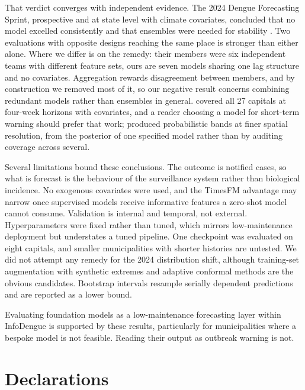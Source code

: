 \documentclass[11pt]{article}
\begin{document}
That verdict converges with independent evidence. The 2024 Dengue Forecasting Sprint,
prospective and at state level with climate covariates, concluded that no model excelled
consistently and that ensembles were needed for stability \citep{Araujo2026sprint}. Two
evaluations with opposite designs reaching the same place is stronger than either alone.
Where we differ is on the remedy: their members were six independent teams with different
feature sets, ours are seven models sharing one lag structure and no covariates.
Aggregation rewards disagreement between members, and by construction we removed most of
it, so our negative result concerns combining redundant models rather than ensembles in
general. \citet{Silva2026capitals} covered all 27 capitals at four-week horizons with
covariates, and a reader choosing a model for short-term warning should prefer that work;
\citet{Freitas2025bands} produced probabilistic bands at finer spatial resolution, from
the posterior of one specified model rather than by auditing coverage across several.

Several limitations bound these conclusions. The outcome is notified cases, so what is
forecast is the behaviour of the surveillance system rather than biological incidence. No
exogenous covariates were used, and the TimesFM advantage may narrow once supervised
models receive informative features a zero-shot model cannot consume. Validation is
internal and temporal, not external. Hyperparameters were fixed rather than tuned, which
mirrors low-maintenance deployment but understates a tuned pipeline. One checkpoint was
evaluated on eight capitals, and smaller municipalities with shorter histories are
untested. We did not attempt any remedy for the 2024 distribution shift, although
training-set augmentation with synthetic extremes \citep{Bannoud2026augment} and adaptive
conformal methods \citep{Gibbs2021adaptive} are the obvious candidates. Bootstrap
intervals resample serially dependent predictions and are reported as a lower bound.

Evaluating foundation models as a low-maintenance forecasting layer within InfoDengue is
supported by these results, particularly for municipalities where a bespoke model is not
feasible. Reading their output as outbreak warning is not.

\section*{Declarations}
\end{document}
